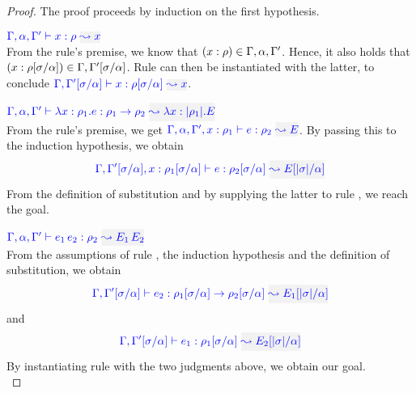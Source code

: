 \begin{proof}
The proof proceeds by induction on the first hypothesis.\\

\item[\fbox{\rref{Ty-Var}}]\quad$\wte{\tenv,\alpha,\tenv'}{x}{\rulet}{x}$\\

From the rule's premise, we know that $(x:\rho) \in \Gamma,\alpha, \Gamma'$.
Hence, it also holds that
$(x:\rho[\sigma/\alpha]) \in \Gamma,\Gamma'[\sigma/\alpha]$. Rule  can then be instantiated with the latter, to conclude
$\wte{\tenv,\tenv'[\suty/\alpha]}{x}{\rulet[\suty/\alpha]}{x}$.\\

\item[\fbox{\rref{Ty-Abs}}]\quad$\wte{\tenv,\alpha,\tenv'}{\abs{x}{\rulet_1}{e}}{\rulet_1\to\rulet_2}{\abs{x}{\etrans{\rulet_1}}{E}}$\\

From the rule's premise, we get
$\wte{\tenv,\alpha,\tenv',\relation{x}{\rulet_1}}{e}{\rulet_2}{E}$. By passing this to the
induction hypothesis, we obtain
\begin{equation*}
\wte{\tenv,\tenv'[\suty/\alpha],\relation{x}{\rulet_1[\suty/\alpha]}}{e}{\rulet_2[\suty/\alpha]}{E[\etrans{\suty}/\alpha]}
\end{equation*}
From the definition of substitution and by supplying the latter to rule , we reach
the goal.\\

\item[\fbox{\rref{Ty-App}}]\quad$\wte{\tenv,\alpha,\tenv'}{\mmapp{e_1}{e_2}}{\rulet_2}{\mmapp{E_1}{E_2}}$\\

From the assumptions of rule , the induction hypothesis and the definition of
substitution, we obtain
\begin{equation*}
\wte{\tenv,\tenv'[\suty/\alpha]}{e_2}{\rulet_1[\suty/\alpha]\to\rulet_2[\suty/\alpha]}{E_1[\etrans{\suty}/\alpha]}
\end{equation*}
and
\begin{equation*}
\wte{\tenv,\tenv'[\suty/\alpha]}{e_1}{\rulet_1[\suty/\alpha]}{E_2[\etrans{\suty}/\alpha]}
\end{equation*}
By instantiating rule  with the two judgments above, we obtain our goal.\\


\end{proof}
